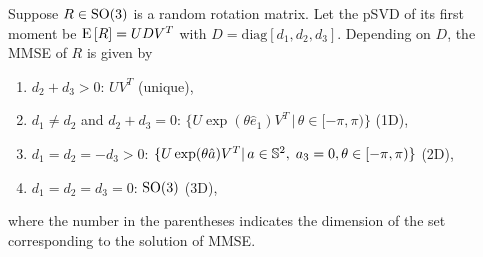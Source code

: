 \begin{lemma} \label{lemma:observability-MMSE}
	Suppose $R\in\mathrm{SO}(3)$ is a random rotation matrix.
	Let the pSVD of its first moment be $\mathrm{E}\left[ R \right]=UDV^T$ with $D=\mathrm{diag}[d_1,d_2,d_3]$. 
	Depending on $D$, the MMSE of $R$ is given by
	\begin{enumerate}
		\item $d_2+d_3 >0$: $UV^T$ (unique),
		\item $d_1\neq d_2$ and $d_2+d_3=0$: $\{U\exp(\theta\hat e_1) V^T\,|\,\theta\in[-\pi,\pi)\}$ (1D),
		\item $d_1=d_2 = -d_3 >0$: $\{U\exp(\theta\hat a) V^T|\, a\in\mathbb{S}^2,\; a_3 =0, \theta\in[-\pi,\pi)\}$ (2D),
		\item $d_1=d_2=d_3=0$:  $\mathrm{SO}(3)$ (3D),
	\end{enumerate}
	where the number in the parentheses indicates the dimension of the set corresponding to the solution of MMSE.
\end{lemma}

